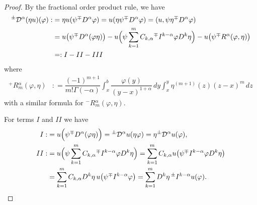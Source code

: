 \documentclass[leqno,final]{siamltex}
\numberwithin{equation}{section}
\renewcommand{\(}{\bigl(}
\renewcommand{\)}{\bigr)}
\begin{document}
    \begin{proof} By the fractional order product rule, we have 
        \begin{align*}
            {^{\pm}}{\mathcal{D}}{^{\alpha}} (\eta u)(\varphi) 
            :& = \eta u ( \psi {^{\mp}}{D}{^{\alpha}} \varphi ) 
            =   u( \eta \psi {^{\mp}}{D}{^{\alpha}} \varphi ) 
            = (u , \psi \eta {^{\mp}}{D}{^{\alpha}} \varphi ) \\
            &= u\bigl(\psi {^{\mp}}{D}{^{\alpha}} (\varphi \eta) \bigr)  - u \Bigl( \psi \sum_{k=1}^{m} C_{k,\alpha} {^{\mp}}{I}{^{k-\alpha}} \varphi D^{k} \eta \Bigr) 
            - u \bigl(\psi {^{\mp}}{R}{^{\alpha}}(\varphi, \eta) \bigr) \\
            &=: I - II - III
        \end{align*}
        where 
        \begin{align*}
        {^{+}}{R}{^{\alpha}_{m}}(\varphi, \eta) &: = \dfrac{(-1)^{m+1}}{m! \Gamma(-\alpha)} \int_{x}^{b} \dfrac{\varphi(y)}{(y-x)^{1+\alpha}}\,dy \int_{x}^{y} \eta^{(m+1)}(z) (z-x)^{m} \,dz 
        \end{align*}
        with a similar formula for ${^{-}}{R}{^{\alpha}_{m}} (\varphi, \eta)$.  
        
        For terms $I$ and $II$  we have 
        \begin{align*}
            I:& =  u\Bigl(\psi {^{\mp}}{D}{^{\alpha}} (\varphi \eta ) \Bigr)  
            ={^{\pm}}{\mathcal{D}}{^{\alpha}}u(\eta \varphi) 
            = \eta {^{\pm}}{\mathcal{D}}{^{\alpha}} u(\varphi),\\
           II:&= u\Bigl( \psi \sum_{k=1}^{m} C_{k,\alpha} {^{\mp}}{I}{^{k-\alpha}} \varphi D^{k} \eta \Bigr)
            = \sum_{k=1}^{m} C_{k,\alpha} u\bigl(\psi {^{\mp}}{I}{^{k-\alpha}} \varphi D^{k} \eta \bigr) \\ 
           &= \sum_{k=1}^{m} C_{k,\alpha} D^{k} \eta \, u\bigl(\psi {^{\mp}}{I}{^{k-\alpha}} \varphi \bigr) 
          = \sum_{k=1}^{m} D^k \eta \, {^{\pm}}{I}{^{k-\alpha}} u (\varphi).
       \end{align*}
   

\end{proof}
\end{document}
